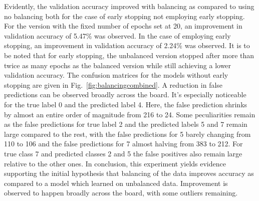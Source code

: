 Evidently, the validation accuracy improved with balancing as compared to using no balancing both for the case of early stopping not employing early stopping. For the version with the fixed number of epochs set at 20, an improvement in validation accuracy of 5.47\% was observed. In the case of employing early stopping, an improvement in validation accuracy of 2.24\% was observed. It is to be noted that for early stopping, the unbalanced version stopped after more than twice as many epochs as the balanced version while still achieving a lower validation accuracy. The confusion matrices for the models without early stopping are given in Fig.~\ref{fig:balancingcombined}. A reduction in false predictions can be observed broadly across the board. It's especially noticeable for the true label 0 and the predicted label 4. Here, the false prediction shrinks by almost an entire order of magnitude from 216 to 24. Some peculiarities remain as the false predictions for true label 2 and the predicted labels 5 and 7 remain large compared to the rest, with the false predictions for 5 barely changing from 110 to 106 and the false predictions for 7 almost halving from 383 to 212. For true class 7 and predicted classes 2 and 5 the false positives also remain large relative to the other ones. In conclusion, this experiment yields evidence supporting the initial hypothesis that balancing of the data improves accuracy as compared to a model which learned on unbalanced data. Improvement is observed to happen broadly across the board, with some outliers remaining.
